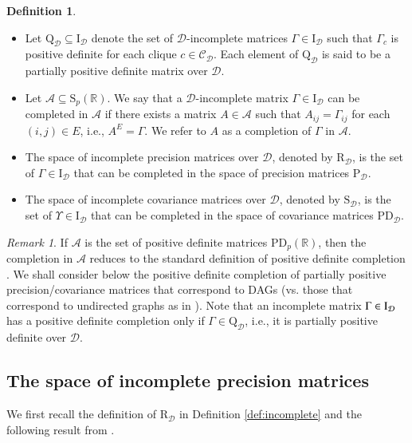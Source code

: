 \documentclass[12pt]{article}
\newcommand{\R}{\mathbb{R}}
\newcommand{\D}{\mathcal{D}}
\newcommand{\Rd}{\mathrm{R}_{\D}}
\newcommand{\Sd}{\mathrm{S}_{\D}}
\theoremstyle{plain}
\theoremstyle{definition}
\newtheorem{definition}[theorem]{Definition}
\theoremstyle{remark}
\newtheorem{Rem}[theorem]{Remark}
\begin{document}
\begin{definition}
\begin{itemize}
    \renewcommand{\labelitemi}{$(d)$}
  \item Let $\mathrm{Q}_{\D} \subseteq \mathrm{I}_{\D}$ denote the set of $\D$-incomplete matrices $\Gamma\in \mathrm{I}_{\D}$ such that  $\Gamma_{c}$ is positive definite for each clique $c\in \mathscr{C}_{\D}$. Each element of $\mathrm{Q}_{\D}$ is said to be a partially positive definite matrix over $\D$. 
   \renewcommand{\labelitemi}{$(e)$}
    \item Let  $\mathcal{A}\subseteq\mathrm{S}_{p}(\R)$. We say that a  $\D$-incomplete matrix $\Gamma\in\mathrm{I}_{\D}$ can be completed in $\mathcal{A}$ if there exists a matrix  $A\in \mathcal{A}$  such that   $A_{ij}=\Gamma_{ij}$  for each  $(i,j)\in E$, i.e., $A^E=\Gamma$. We refer to $A$ as a completion of $\Gamma$ in $\mathcal{A}$.
		 \renewcommand{\labelitemi}{$(f)$}
		\item The space of incomplete precision matrices over $\D$, denoted by $\Rd$, is the set of $\Gamma\in \mathrm{I}_{\D}$ that can be completed in the space of precision matrices $\mathrm{P}_{\D}$. 
		\renewcommand{\labelitemi}{$(g)$}
		\item The space of incomplete covariance matrices over $\D$, denoted by $\Sd$, is the set of $\Upsilon\in \mathrm{I}_{\D}$ that can be completed in the space of covariance matrices $\mathrm{PD}_{\D}$. 
    \end{itemize}
    \end{definition}
  \begin{Rem}
  If $\mathcal{A}$ is the set of positive definite matrices $\mathrm{PD}_{p}(\R)$, then the completion in $\mathcal{A}$ reduces to the standard definition of positive definite completion \cite{Grone84}. We shall consider below the positive definite completion of partially positive precision/covariance  matrices that correspond to DAGs (vs. those that correspond to undirected graphs as in \cite{Grone84}). Note that an incomplete matrix $\Gamma\in\rm{I}_{\D}$ has a positive definite completion only if $\Gamma\in \mathrm{Q}_{\D}$, i.e., it is partially positive definite over $\D$. 
  \end{Rem}
  
\subsection{The space of incomplete precision matrices}\label{subs:Rd}
We first recall the definition of $\Rd$ in Definition \ref{def:incomplete} and the following result from \cite{benraj12}.
 
\end{document}

